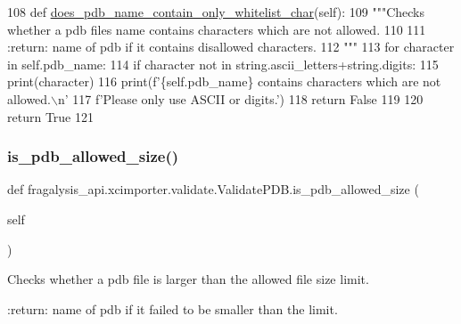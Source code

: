 \begin{DoxyCode}
108     \textcolor{keyword}{def }\hyperlink{classfragalysis__api_1_1xcimporter_1_1validate_1_1_validate_p_d_b_a0775261c2b35a1f1861dabccbba32d02}{does\_pdb\_name\_contain\_only\_whitelist\_char}(self):
109         \textcolor{stringliteral}{"""Checks whether a pdb files name contains characters which are not allowed.}
110 \textcolor{stringliteral}{}
111 \textcolor{stringliteral}{        :return: name of pdb if it contains disallowed characters.}
112 \textcolor{stringliteral}{        """}
113         \textcolor{keywordflow}{for} character \textcolor{keywordflow}{in} self.pdb\_name:
114             \textcolor{keywordflow}{if} character \textcolor{keywordflow}{not} \textcolor{keywordflow}{in} string.ascii\_letters+string.digits:
115                 print(character)
116                 print(f\textcolor{stringliteral}{'\{self.pdb\_name\} contains characters which are not allowed.\(\backslash\)n'}
117                       f\textcolor{stringliteral}{'Please only use ASCII or digits.'})
118                 \textcolor{keywordflow}{return} \textcolor{keyword}{False}
119 
120         \textcolor{keywordflow}{return} \textcolor{keyword}{True}
121 
\end{DoxyCode}
\mbox{\label{classfragalysis__api_1_1xcimporter_1_1validate_1_1_validate_p_d_b_a9e9a8abbb1d90bb2cd17702178831f93}} 
\subsubsection{\texorpdfstring{is\+\_\+pdb\+\_\+allowed\+\_\+size()}{is\_pdb\_allowed\_size()}}
{\footnotesize\ttfamily def fragalysis\+\_\+api.\+xcimporter.\+validate.\+Validate\+P\+D\+B.\+is\+\_\+pdb\+\_\+allowed\+\_\+size (\begin{DoxyParamCaption}\item[{}]{self }\end{DoxyParamCaption})}

\begin{DoxyVerb}Checks whether a pdb file is larger than the allowed file size limit.

:return: name of pdb if it failed to be smaller than the limit.
\end{DoxyVerb}
 

